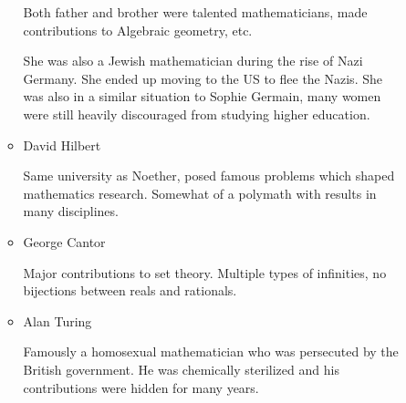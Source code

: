 \documentclass{report}
\begin{document}
\begin{description}
\begin{itemize}
\begin{mdframed}
\begin{itemize}
\begin{mdframed}
                               Both father and brother were talented
                               mathematicians, made contributions to
                               Algebraic geometry, etc.

                               \vspace{10pt}

                               She was also a Jewish mathematician during
                               the rise of Nazi Germany. She ended up moving
                               to the US to flee the Nazis. She was also
                               in a similar situation to Sophie Germain,
                               many women were still heavily discouraged
                               from studying higher education.
                           \end{mdframed}
                           \pagebreak
                       \item David Hilbert
                           \begin{mdframed}
                               Same university as Noether, posed famous
                               problems which shaped mathematics research.
                               Somewhat of a polymath with results in many
                               disciplines.
                           \end{mdframed}
                       \item George Cantor
                           \begin{mdframed}
                               Major contributions to set theory. Multiple
                               types of infinities, no bijections between
                               reals and rationals.
                           \end{mdframed}
                           \begin{center}
                           \end{center}
                       \item Alan Turing
                           \begin{mdframed}
                               Famously a homosexual mathematician
                               who was persecuted by the British
                               government. He was chemically sterilized
                               and his contributions were hidden for
                               many years.


\end{mdframed}
\end{itemize}
\end{mdframed}
\end{itemize}
\end{description}
\end{document}

